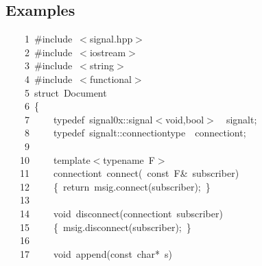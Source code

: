\documentclass[9pt,onside,a4paper]{article}
\newcommand{\hlstd}[1]{\textcolor[rgb]{0.2,0,0.4}{#1}}
\newcommand{\hlppc}[1]{\textcolor[rgb]{0.33,0.45,0.69}{#1}}
\newcommand{\hlopt}[1]{\textcolor[rgb]{0.33,0.33,0.33}{#1}}
\newcommand{\hllin}[1]{\textcolor[rgb]{0.6,0.6,0.6}{#1}}
\newcommand{\hlkwa}[1]{\textcolor[rgb]{1,0.19,0.19}{#1}}
\newcommand{\hlkwb}[1]{\textcolor[rgb]{0.96,0.55,0.14}{#1}}
\newcommand{\hlkwc}[1]{\textcolor[rgb]{0,0,1}{#1}}
\newcommand{\hlkwd}[1]{\textcolor[rgb]{0.82,0.11,0.93}{#1}}
\begin{document}
\subsection{Examples}
\ttfamily
\hlstd{}\hllin{\ \ \ \ 1\ }\hlppc{\#include\ $<$signal.hpp$>$}\\
\hllin{\ \ \ \ 2\ }\hlstd{}\hlppc{\#include\ $<$iostream$>$}\\
\hllin{\ \ \ \ 3\ }\hlstd{}\hlppc{\#include\ $<$string$>$}\\
\hllin{\ \ \ \ 4\ }\hlstd{}\hlppc{\#include\ $<$functional$>$}\\
\hllin{\ \ \ \ 5\ }\hlstd{}\hlkwb{struct\ }\hlstd{Document}\\
\hllin{\ \ \ \ 6\ }\hlopt{\{}\\
\hllin{\ \ \ \ 7\ }\hlstd{}\hlstd{\ \ \ \ }\hlstd{}\hlkwc{typedef\ }\hlstd{signal0x}\hlopt{::}\hlstd{signal}\hlopt{$<$}\hlstd{}\hlkwb{void}\hlstd{}\hlopt{,}\hlstd{}\hlkwb{bool}\hlstd{}\hlopt{$>$}\hlstd{\ \ }\hlopt{}\hlstd{signal\textunderscore t}\hlopt{;}\\
\hllin{\ \ \ \ 8\ }\hlstd{}\hlstd{\ \ \ \ }\hlstd{}\hlkwc{typedef\ }\hlstd{signal\textunderscore t}\hlopt{::}\hlstd{connection\textunderscore type}\hlstd{\ \ }\hlstd{connection\textunderscore t}\hlopt{;}\\
\hllin{\ \ \ \ 9\ }\hlstd{\\
\hllin{\ \ \ 10\ }}\hlstd{\ \ \ \ }\hlstd{}\hlkwc{template}\hlstd{}\hlopt{$<$}\hlstd{typename\ F}\hlopt{$>$}\\
\hllin{\ \ \ 11\ }\hlstd{}\hlstd{\ \ \ \ }\hlstd{connection\textunderscore t\ }\hlkwd{connect}\hlstd{}\hlopt{(\ }\hlstd{}\hlkwb{const\ }\hlstd{F}\hlopt{\&\ }\hlstd{subscriber}\hlopt{)}\\
\hllin{\ \ \ 12\ }\hlstd{}\hlstd{\ \ \ \ }\hlstd{}\hlopt{\{\ }\hlstd{}\hlkwa{return\ }\hlstd{m\textunderscore sig}\hlopt{.}\hlstd{}\hlkwd{connect}\hlstd{}\hlopt{(}\hlstd{subscriber}\hlopt{);\ \}}\\
\hllin{\ \ \ 13\ }\hlstd{\\
\hllin{\ \ \ 14\ }}\hlstd{\ \ \ \ }\hlstd{}\hlkwb{void\ }\hlstd{}\hlkwd{disconnect}\hlstd{}\hlopt{(}\hlstd{connection\textunderscore t\ subscriber}\hlopt{)}\\
\hllin{\ \ \ 15\ }\hlstd{}\hlstd{\ \ \ \ }\hlstd{}\hlopt{\{\ }\hlstd{m\textunderscore sig}\hlopt{.}\hlstd{}\hlkwd{disconnect}\hlstd{}\hlopt{(}\hlstd{subscriber}\hlopt{);\ \}}\\
\hllin{\ \ \ 16\ }\hlstd{\\
\hllin{\ \ \ 17\ }}\hlstd{\ \ \ \ }\hlstd{}\hlkwb{void\ }\hlstd{}\hlkwd{append}\hlstd{}\hlopt{(}\hlstd{}\hlkwb{const\ char}\hlstd{}\hlopt{{*}\ }\hlstd{s}\hlopt{)}\\
\end{document}
